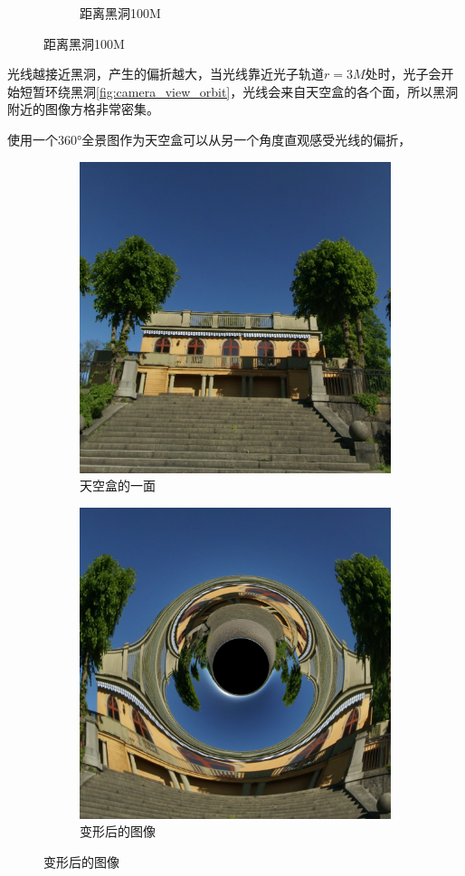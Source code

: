 \begin{figure}[H]
\begin{subfigure}{.5\textwidth}
        \caption{距离黑洞100M}
        \label{fig:blackhole-chessboard} %
    \end{subfigure}
\end{figure}

光线越接近黑洞，产生的偏折越大，当光线靠近光子轨道$r=3M$处时，光子会开始短暂环绕黑洞\ref{fig:camera_view_orbit}，光线会来自天空盒的各个面，所以黑洞附近的图像方格非常密集。

使用一个\ang{360}全景图作为天空盒可以从另一个角度直观感受光线的偏折，
\begin{figure}[H]
    \centering
    \begin{subfigure}{.5\textwidth}
        \centering
        \includegraphics[width=.8\linewidth]{images/building.png}
        \caption{天空盒的一面}
        \label{fig:building}
    \end{subfigure}%
    \begin{subfigure}{.5\textwidth}
        \centering
        \includegraphics[width=.8\linewidth]{images/building_distort.png}
        \caption{变形后的图像}
        \label{fig:building_distort}
    \end{subfigure}
\end{figure}
